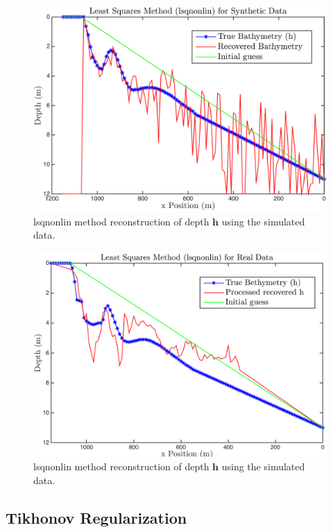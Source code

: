 \begin{figure}[H]
\center
\includegraphics[scale=0.6]{img/lsqnonlin_simulated_10m.png} %
\caption{lsqnonlin method reconstruction of depth $\mathbf{h}$ using the simulated data.}
\label{fmincon_simulated}
\end{figure}

\begin{figure}[H]
\center
\includegraphics[scale=0.6]{img/lsqnonlin_real_data_oct09.png} %
\caption{lsqnonlin method reconstruction of depth $\mathbf{h}$ using the simulated data.}
\label{fmincon_simulated}
\end{figure}

\subsection{Tikhonov Regularization}

